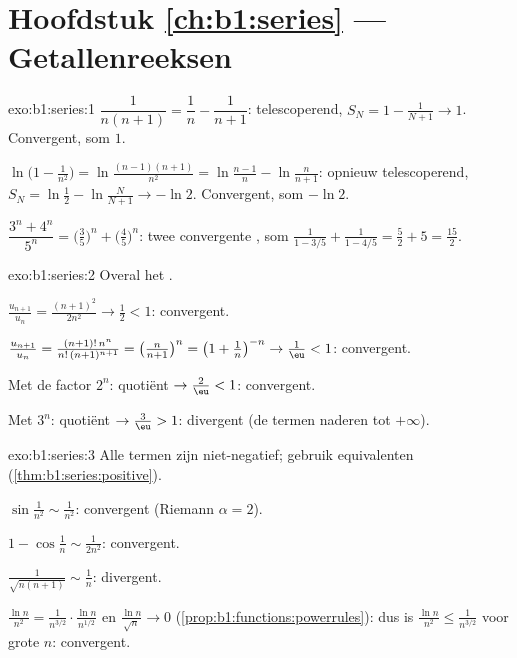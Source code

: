 \section*{Hoofdstuk \ref{ch:b1:series} --- Getallenreeksen}

\begin{solution}{exo:b1:series:1}
$\dfrac{1}{n(n+1)} = \dfrac1n - \dfrac{1}{n+1}$: telescoperend, $S_N
= 1 - \frac{1}{N+1} \to 1$. Convergent, som $1$.

$\ln\bigl(1 - \frac{1}{n^2}\bigr) = \ln\frac{(n-1)(n+1)}{n^2} =
\ln\frac{n-1}{n} - \ln\frac{n}{n+1}$: opnieuw telescoperend, $S_N =
\ln\frac12 - \ln\frac{N}{N+1} \to -\ln 2$. Convergent, som $-\ln 2$.

$\dfrac{3^n + 4^n}{5^n} = \bigl(\frac35\bigr)^n +
\bigl(\frac45\bigr)^n$: twee convergente , som
$\frac{1}{1 - 3/5} + \frac{1}{1 - 4/5} = \frac52 + 5 =
\frac{15}{2}$.
\end{solution}

\begin{solution}{exo:b1:series:2}
Overal het .

$\frac{u_{n+1}}{u_n} = \frac{(n+1)^2}{2n^2} \to \frac12 < 1$:
convergent.

$\frac{u_{n+1}}{u_n} = \frac{(n+1)!\,n^n}{n!\,(n+1)^{n+1}} =
\bigl(\frac{n}{n+1}\bigr)^n = \bigl(1 + \frac1n\bigr)^{-n} \to
\frac1\eu < 1$: convergent.

Met de factor $2^n$: quotiënt $\to \frac2\eu < 1$: convergent.

Met $3^n$: quotiënt $\to \frac3\eu > 1$: divergent (de termen
naderen tot $+\infty$).
\end{solution}

\begin{solution}{exo:b1:series:3}
Alle termen zijn niet-negatief; gebruik equivalenten
(\cref{thm:b1:series:positive}).

$\sin\frac{1}{n^2} \sim \frac{1}{n^2}$: convergent (Riemann $\alpha
= 2$).

$1 - \cos\frac1n \sim \frac{1}{2n^2}$: convergent.

$\frac{1}{\sqrt{n(n+1)}} \sim \frac1n$: divergent.

$\frac{\ln n}{n^2} = \frac{1}{n^{3/2}}\cdot\frac{\ln n}{n^{1/2}}$ en
$\frac{\ln n}{\sqrt n} \to 0$
(\cref{prop:b1:functions:powerrules}): dus is $\frac{\ln n}{n^2}
\leq \frac{1}{n^{3/2}}$ voor grote $n$: convergent.
\end{solution}

